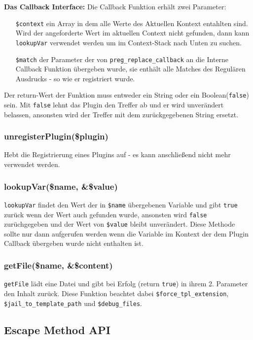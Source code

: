 \documentclass[a4paper,10pt]{article}
\begin{document}
{\bf Das Callback Interface:}\newline
Die Callback Funktion erh\"alt zwei Parameter:
\begin{itemize}
  \item[{\tt \$context}] ein Array in dem alle Werte des Aktuellen Kontext entahlten sind.
    Wird der angeforderte Wert im aktuellen Context nicht gefunden, dann kann {\tt lookupVar} verwendet werden um im Context-Stack nach Unten zu suchen.
  \item[{\tt \$match}] der Parameter der von {\tt preg\_replace\_callback} an die Interne Callback Funktion \"ubergeben wurde,
    sie enth\"alt alle Matches des Regul\"aren Ausdrucks - so wie er registriert wurde.
\end{itemize}
Der return-Wert der Funktion muss entweder ein String oder ein Boolean({\tt false}) sein. Mit {\tt false} lehnt das Plugin den Treffer ab und er wird unver\"andert belassen, ansonsten wird der Treffer mit dem zur\"uckgegebenen String ersetzt.

\subsubsection{unregisterPlugin(\$plugin)}
Hebt die Registrierung eines Plugins auf - es kann anschlie\ss{}end nicht mehr verwendet werden.

\subsubsection{lookupVar(\$name, \&\$value)}
{\tt lookupVar} findet den Wert der in {\tt \$name} \"ubergebenen Variable und gibt {\tt true} zur\"uck wenn der Wert
auch gefunden wurde, ansonsten wird {\tt false} zur\"uchgegeben und der Wert von {\tt \$value} bleibt unver\"andert.
Diese Methode sollte nur dann aufgerufen werden wenn die Variable im Kontext der dem Plugin Callback \"ubergeben wurde nicht enthalten ist.

\subsubsection{getFile(\$name, \&\$content)}
{\tt getFile} l\"adt eine Datei und gibt bei Erfolg (return {\tt true}) in ihrem 2. Parameter den Inhalt zur\"uck. Diese Funktion beachtet
dabei {\tt \$force\_tpl\_extension}, {\tt \$jail\_to\_template\_path} und {\tt \$debug\_files}.

\subsection{Escape Method API}
\end{document}
